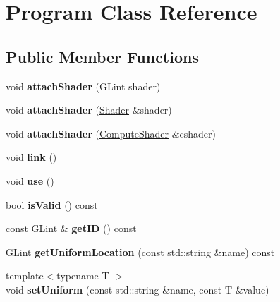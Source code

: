 \hypertarget{class_program}{\section{Program Class Reference}
\label{class_program}
}
\subsection*{Public Member Functions}
\begin{DoxyCompactItemize}
\item 
\hypertarget{class_program_a04bbe6b451cfc0224315b06192c599b0}{void {\bfseries attach\+Shader} (G\+Lint shader)}\label{class_program_a04bbe6b451cfc0224315b06192c599b0}

\item 
\hypertarget{class_program_ad7fe59dc88b063e1cb8a7e78dd39eaf9}{void {\bfseries attach\+Shader} (\hyperlink{class_shader}{Shader} \&shader)}\label{class_program_ad7fe59dc88b063e1cb8a7e78dd39eaf9}

\item 
\hypertarget{class_program_ae726f233f9ad54b683fcc159252aab90}{void {\bfseries attach\+Shader} (\hyperlink{class_compute_shader}{Compute\+Shader} \&cshader)}\label{class_program_ae726f233f9ad54b683fcc159252aab90}

\item 
\hypertarget{class_program_af5dc9639aa5f45d7f0c6bb66c9a73a5a}{void {\bfseries link} ()}\label{class_program_af5dc9639aa5f45d7f0c6bb66c9a73a5a}

\item 
\hypertarget{class_program_a46e2381075fa482b6f0c0cb54348e4c0}{void {\bfseries use} ()}\label{class_program_a46e2381075fa482b6f0c0cb54348e4c0}

\item 
\hypertarget{class_program_acc23c08dde1a437e8088bd00492dc93d}{bool {\bfseries is\+Valid} () const }\label{class_program_acc23c08dde1a437e8088bd00492dc93d}

\item 
\hypertarget{class_program_a1d10418fb06a3665831cce2f52a61877}{const G\+Lint \& {\bfseries get\+I\+D} () const }\label{class_program_a1d10418fb06a3665831cce2f52a61877}

\item 
\hypertarget{class_program_abf1c3e65eb5e84045cb9c6d12ae95f9f}{G\+Lint {\bfseries get\+Uniform\+Location} (const std\+::string \&name) const }\label{class_program_abf1c3e65eb5e84045cb9c6d12ae95f9f}

\item 
\hypertarget{class_program_a3016f6f8be43de235e6489e12f3014d5}{{\footnotesize template$<$typename T $>$ }\\void {\bfseries set\+Uniform} (const std\+::string \&name, const T \&value)}\label{class_program_a3016f6f8be43de235e6489e12f3014d5}

\end{DoxyCompactItemize}
